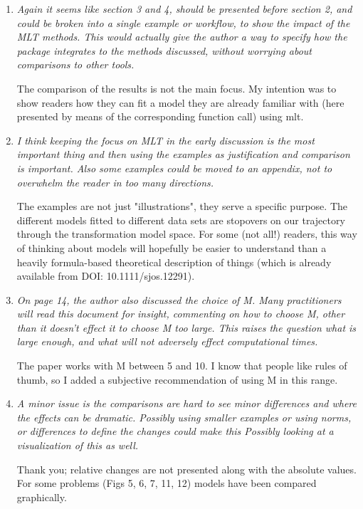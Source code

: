 \documentclass[12pt]{article}
\begin{document}
\begin{enumerate}
\item \textit{Again it seems like section 3 and 4, should be presented
before section 2, and could be broken into a single example or workflow, to
show the impact of the MLT methods.  This would actually give the author a
way to specify how the package integrates to the methods discussed, without
worrying about comparisons to other tools.}

The comparison of the results is not the main focus. My intention was to
show readers how they can fit a model they are already familiar with (here
presented by means of the corresponding function call) using mlt.

\item \textit{I think keeping the focus on MLT
in the early discussion is the most important thing and then using the
examples as justification and comparison is important.  Also some examples
could be moved to an appendix, not to overwhelm the reader in too many
directions.  }

The examples are not just "illustrations", they serve a specific purpose.
The different models fitted to different data sets are stopovers on our
trajectory through the transformation model space. For some (not all!)
readers, this way of thinking about models will hopefully be easier to
understand than a heavily formula-based theoretical description of things
(which is already available from DOI: 10.1111/sjos.12291).

\item \textit{On page 14, the author also discussed the choice of M.  Many
practitioners will read this document for insight, commenting on how to
choose  M, other than it doesn't effect it to choose M too large.  This
raises the question what is large enough, and what will not adversely effect
computational times.  }

The paper works with M between 5 and 10. I know that people like 
rules of thumb, so I added a subjective recommendation of using M in this
range.

\item \textit{A minor issue is the comparisons are hard to see minor
differences and where the effects can be dramatic.  Possibly using smaller
examples or using norms, or differences to define the changes could make
this   Possibly looking at a visualization of this as well.  }

Thank you; relative changes are not presented along with the absolute
values.  For some problems (Figs 5, 6, 7, 11, 12) models have been compared
graphically.


\end{enumerate}
\end{document}
